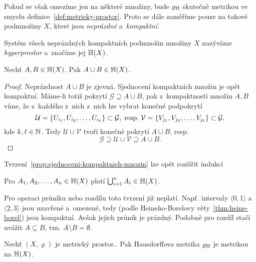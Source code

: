 Pokud se však omezíme jen na některé množiny, bude $\varrho_\textup{H}$ skutečně metrikou ve smyslu definice~\ref{def:metricky-prostor}. Proto se dále zaměříme pouze na takové podmnožiny $X$, které jsou \emph{neprázdné} a~\emph{kompaktní}.
\begin{definition}[Hyperprostor]\label{def:hyperprostor}
    Systém všech neprázdných kompaktních podmnožin množiny $X$ nazýváme \emph{hyperprostor} a~značíme jej $\mathbb{H}(X)$.
\end{definition}
\begin{proposition}\label{prop:sjednoceni-kompaktnich-mnozin}
    Nechť $A,B\in\mathbb{H}(X)$. Pak $A\cup B\in\mathbb{H}(X)$.
\end{proposition}
\begin{proof}
    Neprázdnost $A\cup B$ je zjevná. Sjednocení kompaktních množin je opět kompaktní. Máme-li totiž pokrytí $\mathcal{G}\supseteq A\cup B$, pak z~kompaktnosti množin $A,B$ víme, že z~každého z~nich z~nich lze vybrat konečné podpokrytí
    \[\mathcal{U}=\left\{U_{i_1},U_{i_2},\ldots,U_{i_k}\right\}\subset\mathcal{G},\;\text{resp.}\;\mathcal{V}=\left\{V_{j_1},V_{j_2},\ldots,V_{j_\ell}\right\}\subset\mathcal{G},\]
    kde $k,\ell\in\mathbb{N}$. Tedy $\mathcal{U}\cup\mathcal{V}$ tvoří konečné pokrytí $A\cup B$, resp.
    \[\mathcal{G}\supseteq\mathcal{U}\cup\mathcal{V}\supseteq A\cup B.\]
\end{proof}
Tvrzení~\ref{prop:sjednoceni-kompaktnich-mnozin} lze opět rozšířit indukcí
\begin{corollary}\label{cor:sjednoceni-n-kompaktnich-mnozin}
    Pro $A_1,A_2,\ldots,A_n\in\mathbb{H}(X)$ platí $\bigcup_{i=1}^n A_i\in\mathbb{H}(X)$.
\end{corollary}
Pro operaci průniku nebo rozdílu toto tvrzení již neplatí. Např. intervaly $\langle0,1\rangle$ a~$\langle2,3\rangle$ jsou uzavřené a~omezené, tedy (podle Heineho-Borelovy věty~\ref{thm:heine-borel}) jsou kompaktní. Avšak jejich průnik je prázdný. Podobně pro rozdíl stačí uvážit $A\subseteq B$, tzn. $A\setminus B=\emptyset$.
\begin{theorem}\label{thm:hausdorffova-metrika-je-metrika}
    Nechť $(X,\varrho)$ je metrický prostor.. Pak Hausdorffova metrika $\varrho_\textup{H}$ je metrikou na $\mathbb{H}(X)$.
\end{theorem}
